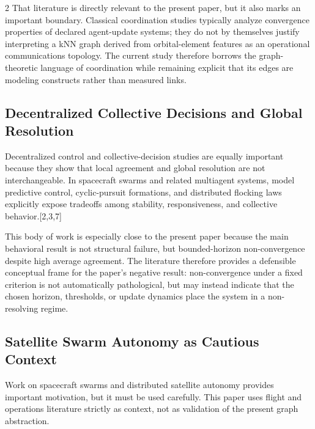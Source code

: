 \documentclass[fleqn,10pt,letterpaper]{article}
\begin{document}
\begin{multicols}{2}
That literature is directly relevant to the present paper, but it also marks an important boundary. Classical coordination studies typically analyze convergence properties of declared agent-update systems; they do not by themselves justify interpreting a kNN graph derived from orbital-element features as an operational communications topology. The current study therefore borrows the graph-theoretic language of coordination while remaining explicit that its edges are modeling constructs rather than measured links.


\subsection{Decentralized Collective Decisions and Global Resolution}

Decentralized control and collective-decision studies are equally important because they show that local agreement and global resolution are not interchangeable. In spacecraft swarms and related multiagent systems, model predictive control, cyclic-pursuit formations, and distributed flocking laws explicitly expose tradeoffs among stability, responsiveness, and collective behavior.[2,3,7]

This body of work is especially close to the present paper because the main behavioral result is not structural failure, but bounded-horizon non-convergence despite high average agreement. The literature therefore provides a defensible conceptual frame for the paper's negative result: non-convergence under a fixed criterion is not automatically pathological, but may instead indicate that the chosen horizon, thresholds, or update dynamics place the system in a non-resolving regime.


\subsection{Satellite Swarm Autonomy as Cautious Context}

Work on spacecraft swarms and distributed satellite autonomy provides important motivation, but it must be used carefully. This paper uses flight and operations literature strictly as context, not as validation of the present graph abstraction.


\end{multicols}
\end{document}
